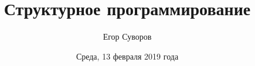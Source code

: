 \documentclass[utf8,xcolor=table]{beamer}
\title{Структурное программирование}
\author{Егор Суворов}
\institute[СПбГУ]{Курс <<Парадигмы и языки программирования>>, группа 18.Б09-пу}
\date[13.02.2019]{Среда, 13 февраля 2019 года}
\begin{document}
\begin{frame}
\titlepage
\end{frame}




\end{document}
